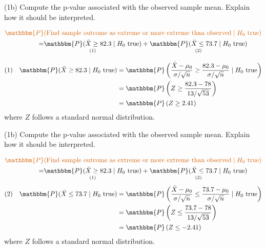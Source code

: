 \documentclass[
  11pt,
  ignorenonframetext,
]{beamer}
\begin{document}
\begin{frame}{(1b) Compute the p-value associated with the observed
sample mean. Explain how it should be interpreted.}
\protect\hypertarget{b-compute-the-p-value-associated-with-the-observed-sample-mean.-explain-how-it-should-be-interpreted.-1}{}
\small

\[
\begin{aligned}
\color{red}{\mathbbm{P}}&\color{red}{(\text{Find sample outcome as extreme or more extreme than observed}\mid H_0 \text{ true})}\\
=&\underset{(1)}{\mathbbm{P}(\bar{X} \geq 82.3 \mid H_0 \text{ true})} + \underset{(2)}{\mathbbm{P}(\bar{X} \leq 73.7 \mid H_0 \text{ true})}\\
\end{aligned}
\]

\small

\[
\begin{aligned}
(1) \quad \mathbbm{P}(\bar{X} \geq 82.3 \mid H_0 \text{ true}) &= \mathbbm{P}\left(\frac{\bar{X}-\mu_0}{\sigma/\sqrt{n}} \geq \frac{82.3-\mu_0}{\sigma/\sqrt{n}} \mid H_0 \text{ true}\right)\\
&= \mathbbm{P}\left(Z \geq \frac{82.3-78}{13/\sqrt{53}}\right)\\
&= \mathbbm{P}\left(Z \geq 2.41 \right)
\end{aligned}
\] where \(Z\) follows a standard normal distribution.
\end{frame}

\begin{frame}{(1b) Compute the p-value associated with the observed
sample mean. Explain how it should be interpreted.}
\protect\hypertarget{b-compute-the-p-value-associated-with-the-observed-sample-mean.-explain-how-it-should-be-interpreted.-2}{}
\small

\[
\begin{aligned}
\color{red}{\mathbbm{P}}&\color{red}{(\text{Find sample outcome as extreme or more extreme than observed}\mid H_0 \text{ true})}\\
=&\underset{(1)}{\mathbbm{P}(\bar{X} \geq 82.3 \mid H_0 \text{ true})} + \underset{(2)}{\mathbbm{P}(\bar{X} \leq 73.7 \mid H_0 \text{ true})}\\
\end{aligned}
\] \small \[
\begin{aligned}
(2) \quad \mathbbm{P}(\bar{X} \leq 73.7 \mid H_0 \text{ true}) &= \mathbbm{P}\left(\frac{\bar{X}-\mu_0}{\sigma/\sqrt{n}} \leq \frac{73.7-\mu_0}{\sigma/\sqrt{n}} \mid H_0 \text{ true}\right)\\
&= \mathbbm{P}\left(Z \leq \frac{73.7-78}{13/\sqrt{53}} \right)\\
&= \mathbbm{P}\left(Z \leq -2.41 \right)
\end{aligned}
\] where \(Z\) follows a standard normal distribution.
\end{frame}
\end{document}
